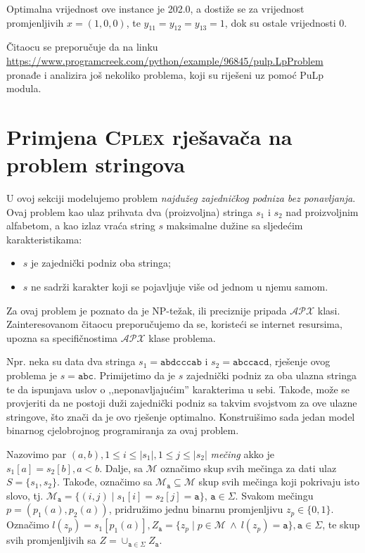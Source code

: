 \documentclass[a4paper, utf8, 11pt, colorlinks]{book}
\theoremstyle{definition}
\begin{document}
 Optimalna vrijednost ove instance je 202.0, a dostiže se za vrijednost promjenljivih $x = (1, 0, 0)$, te $y_{11}= y_{12}= y_{13} = 1$, dok su ostale vrijednosti 0.
 
Čitaocu se preporučuje da na linku \url{https://www.programcreek.com/python/example/96845/pulp.LpProblem}
pronađe i analizira još nekoliko problema, koji su riješeni uz pomoć PuLp modula. 
 
 \section{Primjena \textsc{Cplex} rješavača na problem stringova}
 
 U ovoj sekciji modelujemo problem \emph{najdužeg zajedničkog podniza bez ponavljanja}. Ovaj problem kao ulaz prihvata dva (proizvoljna) stringa $s_1$ i $s_2$ nad proizvoljnim alfabetom, a kao izlaz vraća string $s$ maksimalne dužine sa sljedećim karakteristikama:  
 \begin{itemize}
 	\item $s$ je zajednički podniz oba stringa; 
 	\item $s$ ne sadrži karakter koji se pojavljuje više od jednom u njemu samom.
 \end{itemize}
Za ovaj problem je poznato da je NP-težak, ili preciznije pripada $\mathcal{APX}$ klasi. Zainteresovanom čitaocu preporučujemo da se, koristeći se internet resursima, upozna sa specifičnostima $\mathcal{APX}$ klase problema.

Npr. neka su data dva stringa $s_1 = \texttt{abdcccab}$ i $s_2=\texttt{abccacd}$, rješenje ovog problema je $s=\texttt{abc}$. Primijetimo da je $s$ zajednički podniz za oba ulazna stringa te da ispunjava uslov o ,,neponavljajućim'' karakterima u sebi. Takođe, može se provjeriti da ne postoji duži zajednički podniz sa takvim svojstvom za ove ulazne stringove, što znači da je ovo rješenje optimalno. Konstruišimo sada jedan model binarnog cjelobrojnog programiranja za ovaj problem. 

Nazovimo par $(a, b), 1 \leq i \leq |s_1|, 1 \leq j \leq |s_2|$ \emph{mečing} akko je $s_1[a]=s_2[b], a < b$. Dalje, sa $\mathcal{M}$ označimo skup svih mečinga za dati ulaz $S=\{s_1, s_2\}$. Takođe, označimo sa  $\mathcal{M}_{\texttt{a}} \subseteq \mathcal{M}$  skup svih mečinga koji pokrivaju isto slovo, tj. 
$\mathcal{M}_{\texttt{a}} = \{ (i, j) \mid s_1[i]=s_2[j]=\texttt{a}\}$, $\texttt{a} \in \Sigma$. Svakom mečingu $p=(p_1(a),p_2(a))$, pridružimo jednu binarnu promjenljivu $z_{p} \in \{0, 1\}$. Označimo $l(z_p)= s_1[ p_1(a) ], Z_{\texttt{a}} = \{ z_p \mid p \in \mathcal{M} \ \wedge\  l(z_p) = \texttt{a}\}, \texttt{a}\in \Sigma$, te skup svih promjenljivih sa $Z = \cup_{\texttt{a} \in \Sigma} Z_{\texttt{a}}$. 
\end{document}
